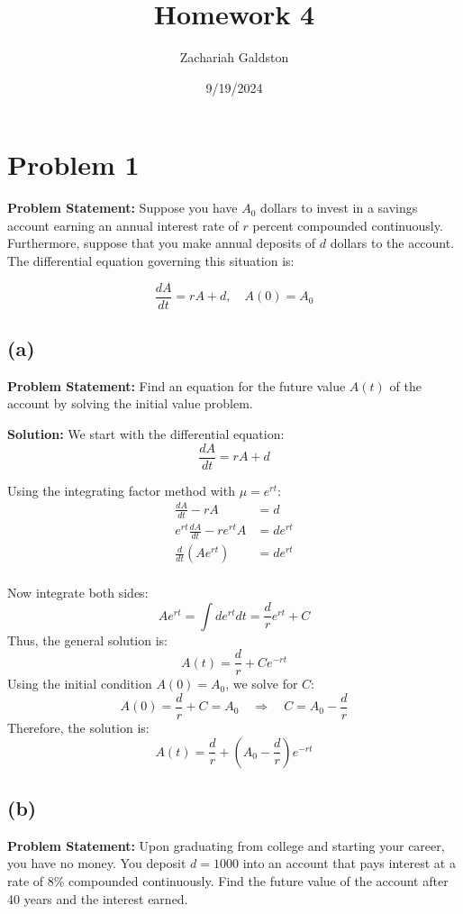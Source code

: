 \documentclass[12pt, letterpaper]{article}
\title{Homework 4}
\author{Zachariah Galdston}
\date{9/19/2024}
\begin{document}
\maketitle

\section*{Problem 1}
\textbf{Problem Statement:} 
Suppose you have $A_0$ dollars to invest in a savings account earning an annual interest rate of $r$ percent compounded continuously. Furthermore, suppose that you make annual deposits of $d$ dollars to the account. The differential equation governing this situation is:

\[
\frac{dA}{dt} = rA + d, \quad A(0) = A_0
\]

\subsection*{(a)}
\textbf{Problem Statement:}
Find an equation for the future value $A(t)$ of the account by solving the initial value problem. 

\textbf{Solution:}
We start with the differential equation:
\[
\frac{dA}{dt} = rA + d
\]

Using the integrating factor method with $\mu = e^{rt}$:
\begin{align*}
\frac{dA}{dt} - rA &= d \\
e^{rt} \frac{dA}{dt} - re^{rt}A &= de^{rt} \\
\frac{d}{dt}(Ae^{rt}) &= de^{rt} \\
\end{align*}

Now integrate both sides:
\[
Ae^{rt} = \int de^{rt} dt = \frac{d}{r}e^{rt} + C
\]
Thus, the general solution is:
\[
A(t) = \frac{d}{r} + Ce^{-rt}
\]
Using the initial condition $A(0) = A_0$, we solve for $C$:
\[
A(0) = \frac{d}{r} + C = A_0 \quad \Rightarrow \quad C = A_0 - \frac{d}{r}
\]
Therefore, the solution is:
\[
A(t) = \frac{d}{r} + \left(A_0 - \frac{d}{r}\right)e^{-rt}
\]

\subsection*{(b)}
\textbf{Problem Statement:}
Upon graduating from college and starting your career, you have no money. You deposit $d = 1000$ into an account that pays interest at a rate of $8\%$ compounded continuously. Find the future value of the account after 40 years and the interest earned.
\end{document}

